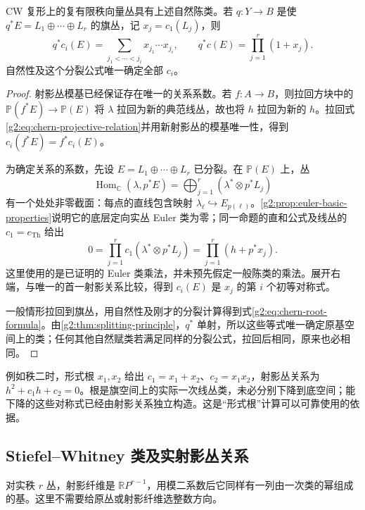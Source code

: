 \begin{theorem}\label{g2:thm:characteristic-existence-uniqueness}
	CW 复形上的复有限秩向量丛具有上述自然陈类。若 \(q:Y\to B\) 是使 \(q^*E=L_1\oplus\cdots\oplus L_r\) 的旗丛，记 \(x_j=c_1(L_j)\)，则
	\begin{equation}\label{g2:eq:chern-root-formula}
		q^*c_i(E)=\sum_{j_1<\cdots<j_i}x_{j_1}\cdots x_{j_i},\qquad
		q^*c(E)=\prod_{j=1}^r(1+x_j).
	\end{equation}
	自然性及这个分裂公式唯一确定全部 \(c_i\)。
\end{theorem}
\begin{proof}
	射影丛模基已经保证存在唯一的关系系数。若 \(f:A\to B\)，则拉回方块中的 \(\mathbb P(f^*E)\to\mathbb P(E)\) 将 \(\lambda\) 拉回为新的典范线丛，故也将 \(h\) 拉回为新的 \(h\)。拉回式\eqref{g2:eq:chern-projective-relation}并用新射影丛的模基唯一性，得到 \(c_i(f^*E)=f^*c_i(E)\)。

	为确定关系的系数，先设 \(E=L_1\oplus\cdots\oplus L_r\) 已分裂。在 \(\mathbb P(E)\) 上，丛
	\[
		\operatorname{Hom}_{\mathbb C}(\lambda,p^*E)
		=\bigoplus_{j=1}^r(\lambda^*\otimes p^*L_j)
	\]
	有一个处处非零截面：每点的直线包含映射 \(\lambda_\ell\hookrightarrow E_{p(\ell)}\)。\cref{g2:prop:euler-basic-properties}说明它的底层定向实丛 Euler 类为零；同一命题的直和公式及线丛的 \(c_1=e_{\mathrm{Th}}\) 给出
	\[
		0=\prod_{j=1}^r c_1(\lambda^*\otimes p^*L_j)
		=\prod_{j=1}^r(h+p^*x_j).
	\]
	这里使用的是已证明的 Euler 类乘法，并未预先假定一般陈类的乘法。展开右端，与唯一的首一射影关系比较，得到 \(c_i(E)\) 是 \(x_j\) 的第 \(i\) 个初等对称式。

	一般情形拉回到旗丛，用自然性及刚才的分裂计算得到式\eqref{g2:eq:chern-root-formula}。由\cref{g2:thm:splitting-principle}，\(q^*\) 单射，所以这些等式唯一确定原基空间上的类；任何其他自然赋类若满足同样的分裂公式，拉回后相同，原来也必相同。
\end{proof}

例如秩二时，形式根 \(x_1,x_2\) 给出 \(c_1=x_1+x_2\)、\(c_2=x_1x_2\)，射影丛关系为 \(h^2+c_1h+c_2=0\)。根是旗空间上的实际一次线丛类，未必分别下降到底空间；能下降的这些对称式已经由射影关系独立构造。这是“形式根”计算可以可靠使用的依据。

\subsection{Stiefel–Whitney 类及实射影丛关系}
\label{g2:subsec:2103:02}
对实秩 \(r\) 丛，射影纤维是 \(\mathbb RP^{r-1}\)，用模二系数后它同样有一列由一次类的幂组成的基。这里不需要给原丛或射影纤维选整数方向。

